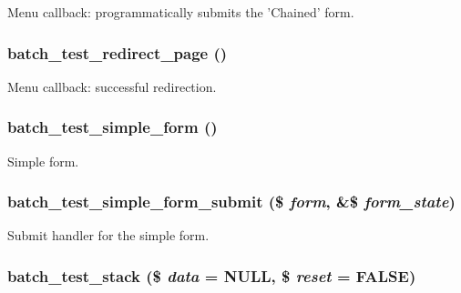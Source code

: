 \label{batch__test_8module_adda6d95301653091f90c0117b69af063}
Menu callback: programmatically submits the 'Chained' form. \hypertarget{batch__test_8module_afb3ec51700a61123e51f3db77ac91d73}{
\subsubsection[{batch\_\-test\_\-redirect\_\-page}]{\setlength{\rightskip}{0pt plus 5cm}batch\_\-test\_\-redirect\_\-page ()}}
\label{batch__test_8module_afb3ec51700a61123e51f3db77ac91d73}
Menu callback: successful redirection. \hypertarget{batch__test_8module_aed91a59cbf3865c50524af68cff9ac7f}{
\subsubsection[{batch\_\-test\_\-simple\_\-form}]{\setlength{\rightskip}{0pt plus 5cm}batch\_\-test\_\-simple\_\-form ()}}
\label{batch__test_8module_aed91a59cbf3865c50524af68cff9ac7f}
Simple form. \hypertarget{batch__test_8module_a33858cdd91ddd2934ac581fd8e8b4ece}{
\subsubsection[{batch\_\-test\_\-simple\_\-form\_\-submit}]{\setlength{\rightskip}{0pt plus 5cm}batch\_\-test\_\-simple\_\-form\_\-submit (\$ {\em form}, \/  \&\$ {\em form\_\-state})}}
\label{batch__test_8module_a33858cdd91ddd2934ac581fd8e8b4ece}
Submit handler for the simple form. \hypertarget{batch__test_8module_a94b2eb54ae9fc920654ceee3aa29786f}{
\subsubsection[{batch\_\-test\_\-stack}]{\setlength{\rightskip}{0pt plus 5cm}batch\_\-test\_\-stack (\$ {\em data} = {\ttfamily NULL}, \/  \$ {\em reset} = {\ttfamily FALSE})}}
